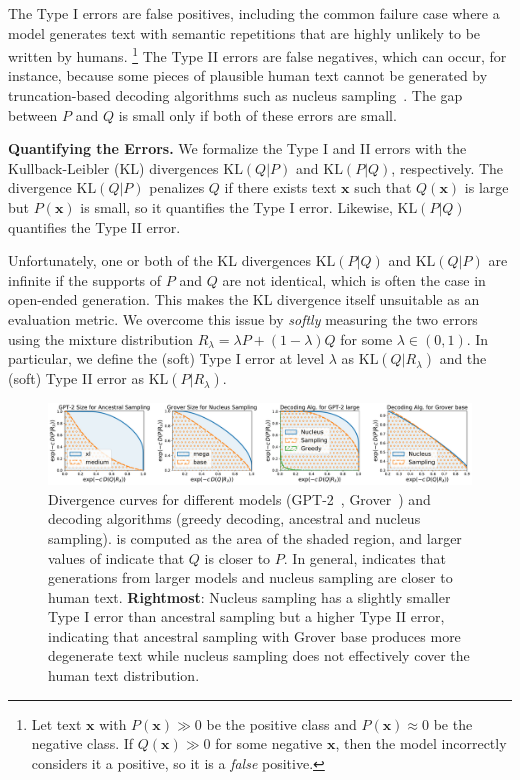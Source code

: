 \documentclass{article}
\newcommand{\myparagraph}[1]{\par\noindent\textbf{{#1}.}} %
\newcommand \xv {\bm{x}}
\theoremstyle{definition}
\newcommand{\kl}{{\mathrm{KL}}}
\newcommand{\name}{{\fontfamily{bch}\selectfont{\textsc{Mauve}}}\xspace}
\begin{document}
The Type I errors are false positives, 
%
including the common failure case where a model generates text with semantic repetitions \cite{dinan2019second,holtzman2019curious,welleck2020neural} that are highly unlikely to be written by humans.%
\footnote{
Let text $\xv$ with $P(\xv) \gg 0$ be the positive class
and $P(\xv) \approx 0$ be the negative class.
If $Q(\xv) \gg 0$ for some negative $\xv$, 
then the model incorrectly considers it a positive,
so it is a {\em false} positive. 
}
The Type II errors are false negatives, 
%
%
which can occur, for instance, because some pieces of plausible human text cannot be generated by truncation-based decoding algorithms such as nucleus sampling~\cite{holtzman2019curious}. 
The gap between $P$ and $Q$ is small only if both of these errors are small.

\myparagraph{Quantifying the Errors}
We formalize the Type I and II errors with the Kullback-Leibler (KL) divergences $\kl(Q|P)$ and $\kl(P|Q)$, respectively. The divergence $\kl(Q|P)$ penalizes $Q$ 
if there exists text $\xv$ such that $Q(\xv)$ is large but $P(\xv)$ is small, so it quantifies the Type I error. 
Likewise, $\kl(P|Q)$ quantifies the Type II error. 

Unfortunately, one or both of the KL divergences $\kl(P|Q)$ and $\kl(Q|P)$ are infinite if the supports of $P$ and $Q$ are not identical, which is often the case in open-ended generation. 
This makes the KL divergence itself unsuitable as an evaluation metric.
%
We overcome this issue by {\em softly} measuring the two errors using the
mixture distribution
$R_\lambda = \lambda P + (1-\lambda)Q$ for some $\lambda \in (0, 1)$.
In particular, we define the (soft) Type I error at level $\lambda$ as $\kl(Q|R_\lambda)$ and the (soft) Type II error as $\kl(P|R_\lambda)$.

\begin{figure}[t]
    \centering
    \includegraphics[width=0.98\linewidth]{fig/illustration/div_curve.pdf}
    \caption{ \small
    Divergence curves for different models (GPT-2~\cite{radford2019language}, Grover~\cite{zellers2019grover}) 
    and decoding algorithms (greedy decoding, ancestral and nucleus sampling). 
    \name is computed as the area of the shaded region, and larger values of \name indicate that $Q$ is closer to $P$.
    In general, \name indicates that generations from larger models and nucleus sampling are closer to human text.
    \textbf{Rightmost}: Nucleus sampling has a slightly smaller Type I error
    than ancestral sampling but a higher Type II error, 
    indicating that ancestral sampling with Grover base produces more degenerate text while nucleus sampling 
    does not effectively cover the human text distribution.
    }
    \label{fig:mauve:illustration}
\end{figure}
\end{document}
